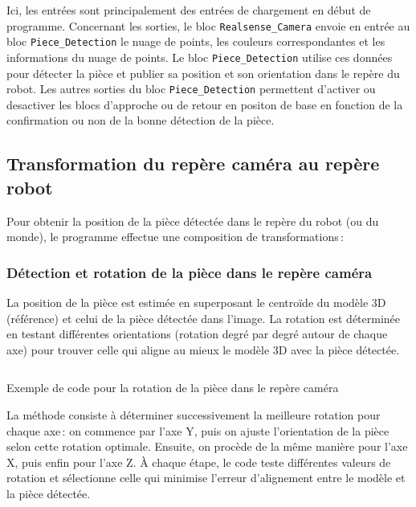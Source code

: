 Ici, les entrées sont principalement des entrées de chargement en début de programme. Concernant les sorties, le bloc \texttt{Realsense\_Camera} envoie en entrée au bloc \texttt{Piece\_Detection} le nuage de points, les couleurs correspondantes et les informations du nuage de points. Le bloc \texttt{Piece\_Detection} utilise ces données pour détecter la pièce et publier sa position et son orientation dans le repère du robot. Les autres sorties du bloc \texttt{Piece\_Detection} permettent d'activer ou desactiver les blocs d'approche ou de retour en positon de base en fonction de la confirmation ou non de la bonne détection de la pièce.

\subsection{Transformation du repère caméra au repère robot}

\sloppy

Pour obtenir la position de la pièce détectée dans le repère du robot (ou du monde), le programme effectue une composition de transformations :

\subsubsection{Détection et rotation de la pièce dans le repère caméra}

La position de la pièce est estimée en superposant le centroïde du modèle 3D (référence) et celui de la pièce détectée dans l'image. La rotation est déterminée en testant différentes orientations (rotation degré par degré autour de chaque axe) pour trouver celle qui aligne au mieux le modèle 3D avec la pièce détectée.

\setlength{\belowcaptionskip}{0pt}
\begin{listing}[H]
    \inputminted{python}{assets/code/rotation.py}
    \caption{Exemple de code pour la rotation de la pièce dans le repère caméra}
\end{listing}
La méthode consiste à déterminer successivement la meilleure rotation pour chaque axe : on commence par l’axe Y, puis on ajuste l’orientation de la pièce selon cette rotation optimale. Ensuite, on procède de la même manière pour l’axe X, puis enfin pour l’axe Z. À chaque étape, le code teste différentes valeurs de rotation et sélectionne celle qui minimise l’erreur d’alignement entre le modèle et la pièce détectée.

